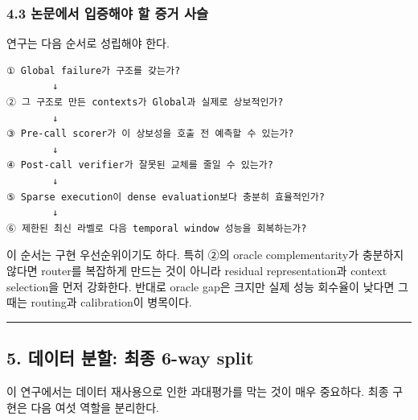 \subsubsection{4.3 논문에서 입증해야 할 증거 사슬}
연구는 다음 순서로 성립해야 한다.


\begin{Verbatim}[breaklines=true,breakanywhere=true,fontsize=\scriptsize]
① Global failure가 구조를 갖는가?
        ↓
② 그 구조로 만든 contexts가 Global과 실제로 상보적인가?
        ↓
③ Pre-call scorer가 이 상보성을 호출 전 예측할 수 있는가?
        ↓
④ Post-call verifier가 잘못된 교체를 줄일 수 있는가?
        ↓
⑤ Sparse execution이 dense evaluation보다 충분히 효율적인가?
        ↓
⑥ 제한된 최신 라벨로 다음 temporal window 성능을 회복하는가?

\end{Verbatim}
이 순서는 구현 우선순위이기도 하다. 특히 ②의 oracle complementarity가 충분하지 않다면 router를 복잡하게 만드는 것이 아니라 residual representation과 context selection을 먼저 강화한다. 반대로 oracle gap은 크지만 실제 성능 회수율이 낮다면 그때는 routing과 calibration이 병목이다.


\medskip\hrule\medskip
\subsection{5. 데이터 분할: 최종 6-way split}
이 연구에서는 데이터 재사용으로 인한 과대평가를 막는 것이 매우 중요하다. 최종 구현은 다음 여섯 역할을 분리한다.


